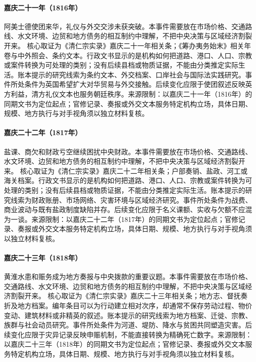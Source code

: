 \hypertarget{civic:EQ-1816-AMHERST-MISSION}{}\paragraph{嘉庆二十一年（1816年）}阿美士德使团来华，礼仪与外交交涉未获突破。本事件需要放在市场价格、交通路线、水文环境、边贸和地方债务的相互制约中理解，不把中央决策与区域经济割裂开来。 核心取证为《清仁宗实录》嘉庆二十一年相关条；《筹办夷务始末》相关年卷与中外照会、条约文本。行政文书显示的是机构如何把道路、港口、人口、宗教或案件转换为可处理的类别；没有后续县档或物质证据，不能由分类推定实际生活。账本提示的研究线索为条约文本、外交档案、口岸社会与国际法实践研究。事件所处条件为英国希望扩大对华贸易与外交接触。后续变化应限于使团叙述反映英方利益，清方礼仪文本也服务朝廷秩序。来源限制：以嘉庆二十一年（1816年）的同期文书为定位起点；官修记录、奏报或外交文本服务特定机构立场，具体日期、规模、地方执行与对手视角须以独立材料复核。
\hypertarget{civic:EQ-1817-SALT-ARREARS}{}\paragraph{嘉庆二十二年（1817年）}盐课、商欠和财政亏空继续困扰中央财政。本事件需要放在市场价格、交通路线、水文环境、边贸和地方债务的相互制约中理解，不把中央决策与区域经济割裂开来。 核心取证为《清仁宗实录》嘉庆二十二年相关条；户部奏销、盐政、河工或海关档案。行政文书显示的是机构如何把道路、港口、人口、宗教或案件转换为可处理的类别；没有后续县档或物质证据，不能由分类推定实际生活。账本提示的研究线索为财政账册、市场网络、灾害环境与区域经济研究。事件所处条件为战费、商业波动与既有盐政制度缺陷并存。后续变化应限于名义课额、实收与欠额不应混为一谈。来源限制：以嘉庆二十二年（1817年）的同期文书为定位起点；官修记录、奏报或外交文本服务特定机构立场，具体日期、规模、地方执行与对手视角须以独立材料复核。
\hypertarget{civic:EQ-1818-FLOOD-RELIEF}{}\paragraph{嘉庆二十三年（1818年）}黄淮水患和赈务成为地方奏报与中央拨款的重要议题。本事件需要放在市场价格、交通路线、水文环境、边贸和地方债务的相互制约中理解，不把中央决策与区域经济割裂开来。 核心取证为《清仁宗实录》嘉庆二十三年相关条；地方志、督抚奏折及地方档案。编年条目可以为行动建立相对次序，却通常不保存劳动过程、物价变动、建筑材料或非精英的叙述。账本提示的研究线索为地方档案、迁徙、宗教、族群与社会动员研究。事件所处条件为河道、堤防、降水与贫困共同塑造灾害。后续变化应限于灾异记录反映申赈机制，不能直接转换为精确死亡数字。来源限制：以嘉庆二十三年（1818年）的同期文书为定位起点；官修记录、奏报或外交文本服务特定机构立场，具体日期、规模、地方执行与对手视角须以独立材料复核。
